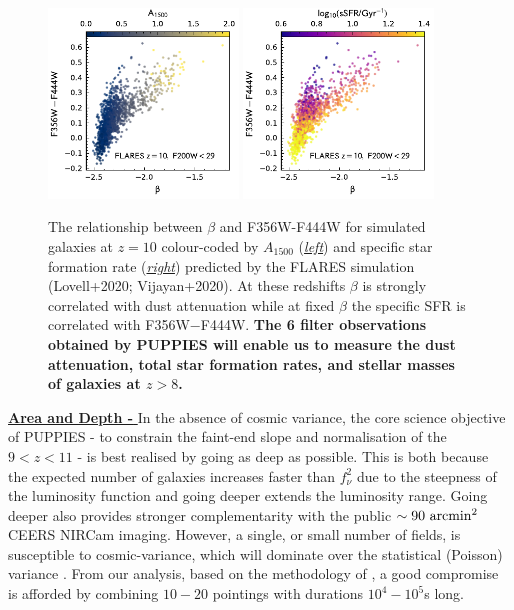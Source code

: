 \documentclass[12pt]{article}
\begin{document}
\begin{figure}[h!]
    \centering
    \includegraphics[width=0.45\textwidth]{figs/beta_A1500.pdf}
    \includegraphics[width=0.45\textwidth]{figs/beta_sSFR.pdf}
    \caption{The relationship between $\beta$ and F356W-F444W for simulated galaxies at $z=10$ colour-coded by $A_{1500}$ (\emph{\underline{left}}) and specific star formation rate (\emph{\underline{right}}) predicted by the FLARES simulation (Lovell+2020; Vijayan+2020). At these redshifts $\beta$ is strongly correlated with dust attenuation while at fixed $\beta$ the specific SFR is correlated with F356W$-$F444W. \textbf{The 6 filter observations obtained by PUPPIES will enable us to measure the dust attenuation, total star formation rates, and stellar masses of galaxies at $z>8$.}}
    \label{fig:beta}
\end{figure}

\noindent
\underline{\bf Area and Depth - } In the absence of cosmic variance, the core science objective of PUPPIES - to constrain the faint-end slope and normalisation of the $9<z<11$ - is best realised by going as deep as possible. This is both because the expected number of galaxies increases faster than $f_{\nu}^2$ due to the steepness of the luminosity function and going deeper extends the luminosity range. Going deeper also provides stronger complementarity with the public $\sim 90\ {\rm arcmin}^2$ CEERS NIRCam imaging. However, a single, or small number of fields, is susceptible to cosmic-variance, which will dominate over the statistical (Poisson) variance \citep[e.g][]{2020MNRAS.499.2401T}. From our analysis, based on the methodology of \citet{2020MNRAS.499.2401T}, a good compromise is afforded by combining $10-20$ pointings with durations $10^4-10^5$s long. 
\end{document}
